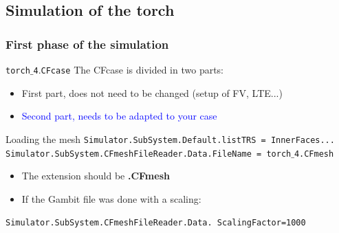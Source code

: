 \documentclass[compress,10pt]{beamer}
\begin{document}
\subsection{Simulation of the torch}
\begin{frame}
\frametitle{First phase of the simulation}
  \begin{block}{\texttt{torch$\_$4$.$CFcase}}
 The CFcase is divided in two parts:
   \begin{itemize}
    \item First part, does not need to be changed (setup of FV, LTE...)
    \item \textcolor{blue}{Second part, needs to be adapted to your case}
   \end{itemize}
 \end{block}
 \begin{block}{Loading the mesh}
\texttt{\small{Simulator.SubSystem.Default.listTRS = InnerFaces...}}
\texttt{\small{Simulator.SubSystem.CFmeshFileReader.Data.FileName = 
                      \hspace*{8cm}      torch$\_$4.CFmesh}}\\
\begin{itemize}
 \item The extension should be {\bf{.CFmesh}}
 \item If the Gambit file was done with a scaling:
\end{itemize}
\texttt{\small{Simulator.SubSystem.CFmeshFileReader.Data.
\hspace*{6cm}  ScalingFactor=1000}}
 \end{block}
 \end{frame}
\end{document}
